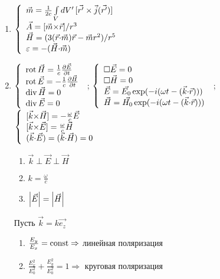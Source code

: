 \begin{enumerate}[label=\textbf{\underline{\arabic*.}}]
\item $\left\{\begin{array}{l}
            \vec{m} = \frac1{2c}\int\limits_V dV'\,[\vec{r'}\times\vec{j}(\vec{r'})]\\
            \vec{A} = [\vec{m}{\times}\vec{r}]/r^3\\
            \vec{H} = (3(\vec{r}{\cdot}\vec{m})\vec{r}-\vec{m}r^2)/r^5\\
            \varepsilon = -(\vec{H}{\cdot}\vec{m})
      \end{array}\right.$
\item $\left\{\begin{array}{l}
            \operatorname{rot}\vec{H}=\frac1{c}\frac{\partial \vec{E}}{\partial t}\\
            \operatorname{rot}\vec{E}=-\frac1{c}\frac{\partial \vec{H}}{\partial t}\\
            \operatorname{div}\vec{H}=0\\
            \operatorname{div}\vec{E}=0\\
      \end{array}\right.$  ;
      $\left\{\begin{array}{l}
            \square\vec{E}=0\\
            \square\vec{H}=0\\
            \vec{E}=\vec{E_0}\exp(-i(\omega t-(\vec{k}{\cdot}\vec{r})))\\
            \vec{H}=\vec{H_0}\exp(-i(\omega t-(\vec{k}{\cdot}\vec{r})))
      \end{array}\right.$  ;
      $\left\{\begin{array}{l}
            \vmult{k}{H}=-\frac{\omega}{c}\vec{E}\\
            \vmult{k}{E}=\frac{\omega}{c}\vec{H}\\
            \scmult{k}{E}=\scmult{k}{H}=0
      \end{array}\right.$\\
      \begin{enumerate}
      \item $\vec{k}\perp\vec{E}\perp\vec{H} $
      \item $k=\frac{\omega}{c} $
      \item $\left| \vec{E} \right| = \left| \vec{H} \right|$
      \end{enumerate}
      Пусть $\vec{k}=k\vec{e_z} $\\
      \begin{enumerate}
      \item $\frac{E_y}{E_x}=\operatorname{const}\Rightarrow$ линейная поляризация
      \item $\frac{E_x^2}{E_0^2}+\frac{E_y^2}{E_0^2}=1 \Rightarrow$ круговая поляризация

\end{enumerate}
\end{enumerate}
